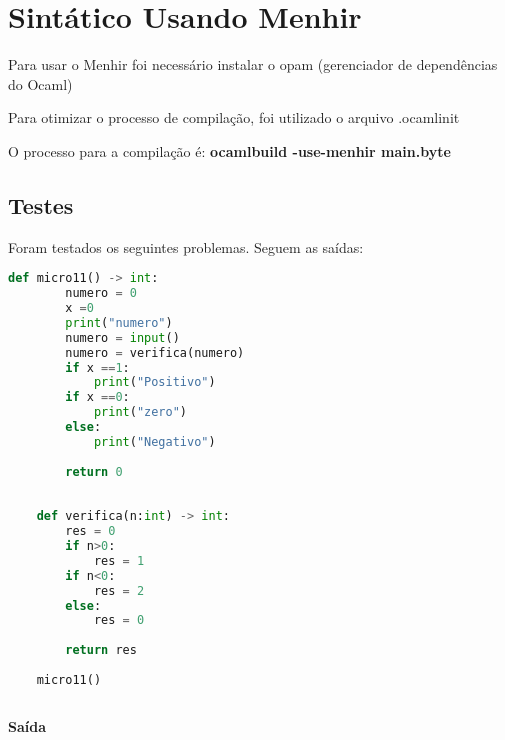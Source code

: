 \documentclass[hidelinks,12pt]{article}
\begin{document}
\section{Sintático Usando Menhir}

Para usar o Menhir foi necessário instalar o opam (gerenciador de dependências do Ocaml)

	\noindent{}


Para otimizar o processo de compilação, foi utilizado o arquivo .ocamlinit

\noindent{}

O processo para a compilação é:
\textbf{ocamlbuild -use-menhir main.byte}


\subsection{Testes}

Foram testados os seguintes problemas.
Seguem as saídas:

	\begin{lstlisting}[caption=sintatico.mli, language=python]
	def micro11() -> int:
		numero = 0
		x =0
		print("numero")
		numero = input()
		numero = verifica(numero)
		if x ==1:
			print("Positivo")
		if x ==0:
			print("zero")
		else:
			print("Negativo")
	
		return 0
	
	
	def verifica(n:int) -> int:
		res = 0
		if n>0:
			res = 1
		if n<0:
			res = 2
		else:
			res = 0
		
		return res
	
	micro11()
	
	\end{lstlisting}
	
	\textbf{{\large Saída}}
	
\end{document}
